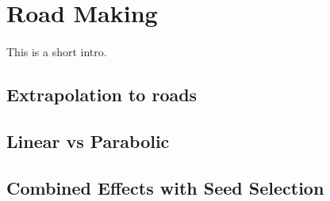 \section{Road Making}
\paragraph{}
This is a short intro.
\subsection{Extrapolation to roads}
\subsection{Linear vs Parabolic}
\subsection{Combined Effects with Seed Selection}